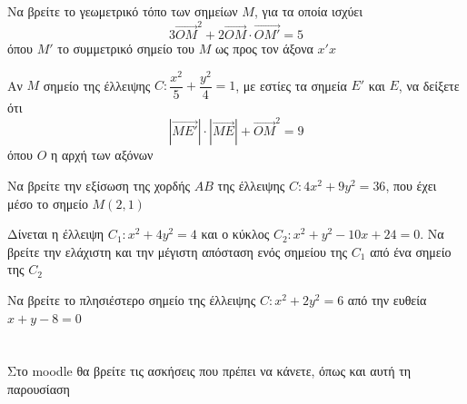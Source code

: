 \documentclass{../../presentation}
\begin{document}
\begin{askisi}
  Να βρείτε το γεωμετρικό τόπο των σημείων $Μ$, για τα οποία ισχύει
  $$3\overrightarrow{OM}^2+2\overrightarrow{OM}\cdot \overrightarrow{OM'}=5$$
  όπου $M'$ το συμμετρικό σημείο του $M$ ως προς τον άξονα $x'x$


\end{askisi}

\begin{askisi}
  Αν $Μ$ σημείο της έλλειψης $C:\dfrac{x^2}{5}+\dfrac{y^2}{4}=1$, με εστίες τα σημεία $Ε'$ και $Ε$, να δείξετε ότι
  $$|\overrightarrow{ΜΕ'}|\cdot |\overrightarrow{ΜΕ}|+\overrightarrow{ΟΜ}^2=9$$
  όπου $Ο$ η αρχή των αξόνων


\end{askisi}

\begin{askisi}
  Να βρείτε την εξίσωση της χορδής $ΑΒ$ της έλλειψης $C:4x^2+9y^2=36$, που έχει μέσο το σημείο $Μ(2,1)$


\end{askisi}

\begin{askisi}
  Δίνεται η έλλειψη $C_1:x^2+4y^2=4$ και ο κύκλος $C_2:x^2+y^2-10x+24=0$. Να βρείτε την ελάχιστη και την μέγιστη απόσταση ενός σημείου της $C_1$ από ένα σημείο της $C_2$


\end{askisi}

\begin{askisi}
  Να βρείτε το πλησιέστερο σημείο της έλλειψης $C:x^2+2y^2=6$ από την ευθεία $x+y-8=0$


\end{askisi}

\appendix

\section{}
\begin{frame}
  Στο moodle θα βρείτε τις ασκήσεις που πρέπει να κάνετε, όπως και αυτή τη παρουσίαση
\end{frame}
\end{document}
